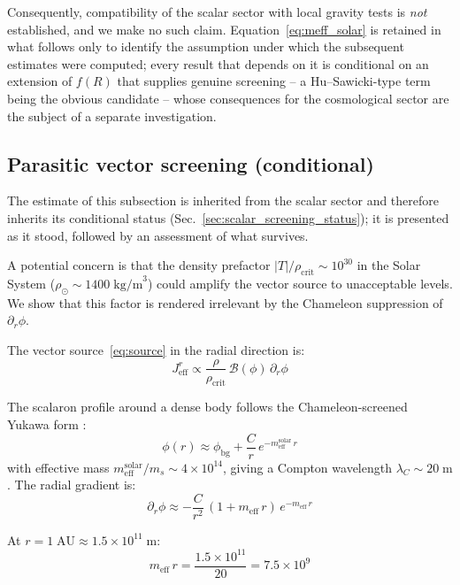 \documentclass[aps,prd,twocolumn,superscriptaddress,nofootinbib]{revtex4-2}
\begin{document}
Consequently, compatibility of the scalar sector with local gravity tests is \textit{not} established, and we make no such claim. Equation~\eqref{eq:meff_solar} is retained in what follows only to identify the assumption under which the subsequent estimates were computed; every result that depends on it is conditional on an extension of $f(R)$ that supplies genuine screening -- a Hu--Sawicki-type term being the obvious candidate -- whose consequences for the cosmological sector are the subject of a separate investigation.

\subsection{Parasitic vector screening (conditional)}
\label{sec:parasitic}

The estimate of this subsection is inherited from the scalar sector and therefore inherits its conditional status (Sec.~\ref{sec:scalar_screening_status}); it is presented as it stood, followed by an assessment of what survives.

A potential concern is that the density prefactor $|T|/\rho_{\mathrm{crit}} \sim 10^{30}$ in the Solar System ($\rho_\odot \sim 1400\;\mathrm{kg/m}^3$) could amplify the vector source to unacceptable levels. We show that this factor is rendered irrelevant by the Chameleon suppression of $\partial_r\phi$.

The vector source~\eqref{eq:source} in the radial direction is:
\begin{equation}
J^r_{\mathrm{eff}} \propto \frac{\rho}{\rho_{\mathrm{crit}}}\,\mathcal{B}(\phi)\,\partial_r\phi
\end{equation}

The scalaron profile around a dense body follows the Chameleon-screened Yukawa form \cite{Geiger2026c}:
\begin{equation}
\phi(r) \approx \phi_{\mathrm{bg}} + \frac{C}{r}\,e^{-m_{\mathrm{eff}}^{\mathrm{solar}}\,r}
\end{equation}
with effective mass $m_{\mathrm{eff}}^{\mathrm{solar}}/m_s \sim 4 \times 10^{14}$, giving a Compton wavelength $\lambda_C \sim 20\;\mathrm{m}$. The radial gradient is:
\begin{equation}
\partial_r\phi \approx -\frac{C}{r^2}\,(1 + m_{\mathrm{eff}}\,r)\,e^{-m_{\mathrm{eff}}\,r}
\end{equation}

At $r = 1\;\mathrm{AU} \approx 1.5 \times 10^{11}\;\mathrm{m}$:
\begin{equation}
m_{\mathrm{eff}}\,r = \frac{1.5 \times 10^{11}}{20} = 7.5 \times 10^9
\end{equation}
\end{document}
